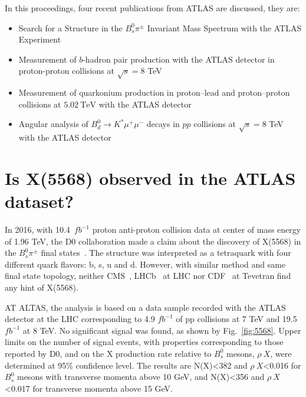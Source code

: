 \documentclass[epj]{webofc}
\begin{document}
In this proceedings, four recent publications from ATLAS are discussed, they are:
\begin{itemize}
  \item Search for a Structure in the $B^0_s \pi^\pm$ Invariant Mass Spectrum with the ATLAS Experiment~\cite{x5568}
  \item Measurement of $b$-hadron pair production with the ATLAS detector in proton-proton collisions at $\sqrt{s}=8$ TeV~\cite{bpair}
  \item Measurement of quarkonium production in proton–lead and proton–proton collisions at $5.02~\mathrm {TeV}$ with the ATLAS detector~\cite{quark_pro}
  \item Angular analysis of $B^0_d \rightarrow K^{*}\mu^+\mu^-$ decays in $pp$ collisions at $\sqrt{s}= 8$ TeV with the ATLAS detector~\cite{kmumu}
\end{itemize}

\section{Is X(5568) observed in the ATLAS dataset?}
\label{5568}

In 2016, with 10.4~$fb^{-1}$ proton anti-proton collision data at center of mass energy of 1.96 TeV, the D0 collaboration made a claim about
the discovery of X(5568) in the $B^0_s \pi^\pm$ final states~\cite{D0:2016mwd}. The structure was interpreted as a tetraquark with four 
different quark flavors: b, s, u and d. However, with similar method and same final state topology, neither CMS~\cite{Sirunyan:2017ofq}, LHCb~\cite{Aaij:2016iev} 
at LHC nor CDF~\cite{Aaltonen:2017voc} at Tevetran find any hint of X(5568).   

AT ALTAS, the analysis is based on a data sample recorded with the ATLAS detector at the LHC corresponding to 4.9 
$fb^{-1}$ of pp collisions at 7 TeV and 19.5 $fb^{-1}$ at 8 TeV.
No significant signal was found, as shown by Fig.~\ref{fig:5568}. Upper limits on the number of signal events, with properties corresponding to 
those reported by D0, and on the X production rate relative to $B_{s}^{0}$ mesons, $\rho~X$, were determined at 95\% confidence level. 
The results are N(X)<382 and $\rho~X$<0.016 for $B_{s}^{0}$ mesons with transverse momenta above 10 GeV, and N(X)<356 and $\rho~X$<0.017 for 
transverse momenta above 15 GeV. 
\end{document}
